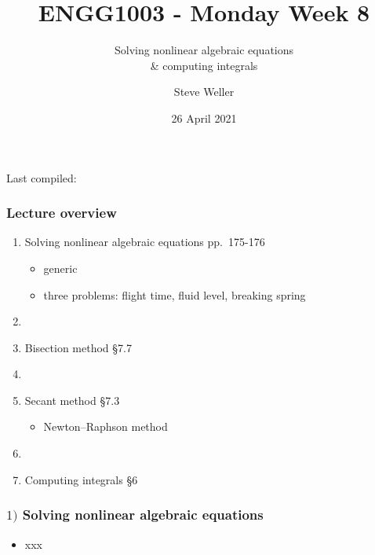\documentclass[english,14pt]{beamer}
\title{ENGG1003 - Monday Week 8}
\subtitle{Solving nonlinear algebraic equations \\ \& computing integrals}
\author{Steve Weller}
\institute{University of Newcastle}
\date{26 April 2021}
\newcommand\red[1]{{\color{red} #1}}
\begin{document}
\begin{flushleft}
{\scriptsize Last compiled:~\DTMnow}
\vspace*{-5mm}
\end{flushleft}
\framebreak


\begin{frame}[fragile]

\frametitle{Lecture overview}
\begin{enumerate}
	\item Solving nonlinear algebraic equations \red{pp.~175-176}
	\begin{itemize}
		\item generic
		\item three problems: flight time, fluid level, breaking spring
	\end{itemize}
	
	\item[]
	
	\item Bisection method \red{\S7.7}
	
	\item[]
	
	\item Secant method \red{\S7.3}
	\begin{itemize}
		\item Newton--Raphson method
	\end{itemize}
	
	\item[]
	
	\item Computing integrals \red{\S6}

\end{enumerate}

\end{frame}


\begin{frame}[fragile]

\frametitle{$1)$ Solving nonlinear algebraic equations}

\begin{itemize}
	\item xxx
\end{itemize}

\end{frame}

\end{document}
